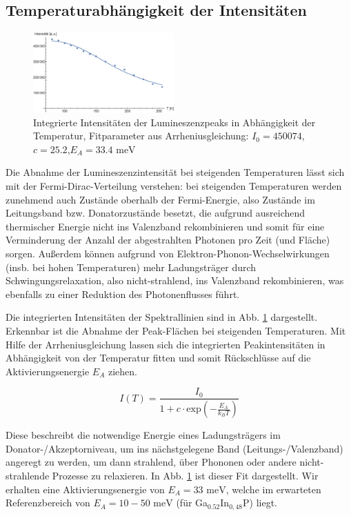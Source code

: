 \documentclass[aps,twocolumn,secnumarabic,nobalancelastpage,amsmath,amssymb,
nofootinbib,superscriptaddress]{revtex4-1}
\begin{document}
\subsection{Temperaturabhängigkeit der Intensitäten}

\begin{figure}[b]
  \centering
  \includegraphics[width=0.48\textwidth]{../Messung/integrintenstempfit.eps}
  \caption{\label{fig:intInt}Integrierte Intensitäten der Lumineszenzpeaks in Abhängigkeit
  der Temperatur,
  Fitparameter aus Arrheniusgleichung: $I_0=450074$,$c=25.2$,$E_A=33.4\text{ meV}$}
\end{figure}

\noindent Die Abnahme der Lumineszenzintensität bei steigenden Temperaturen lässt sich mit der Fermi-Dirac-Verteilung
verstehen: bei steigenden Temperaturen werden zunehmend auch Zustände oberhalb der Fermi-Energie, also Zustände
im Leitungsband bzw. Donatorzustände besetzt, die aufgrund ausreichend thermischer Energie nicht ins Valenzband
rekombinieren und somit für eine Verminderung der Anzahl der abgestrahlten Photonen pro Zeit (und Fläche) sorgen.
Außerdem können aufgrund von Elektron-Phonon-Wechselwirkungen (insb. bei hohen Temperaturen) mehr Ladungsträger durch
Schwingungsrelaxation, also nicht-strahlend, ins Valenzband rekombinieren, was ebenfalls zu einer Reduktion des
Photonenflusses führt.

Die integrierten Intensitäten der Spektrallinien sind in Abb. \ref{fig:intInt} dargestellt. Erkennbar ist
die Abnahme der Peak-Flächen bei steigenden Temperaturen. Mit Hilfe der Arrheniusgleichung lassen sich die integrierten
Peakintensitäten in Abhängigkeit von der Temperatur fitten und somit Rückschlüsse auf die Aktivierungsenergie $E_A$ ziehen.

  \begin{equation}
    I(T) = \frac{I_0}{1+c\cdot\text{exp}\left( -\frac{E_A}{k_B T} \right)}
  \end{equation}

\noindent Diese beschreibt die notwendige Energie eines Ladungsträgers im Donator-/Akzeptorniveau, um ins nächstgelegene Band
(Leitungs-/Valenzband) angeregt zu werden, um dann strahlend, über Phononen oder andere nicht-strahlende Prozesse zu relaxieren.
In Abb. \ref{fig:intInt} ist dieser Fit dargestellt. Wir erhalten eine Aktivierungsenergie von $E_A=33 \text{ meV}$, welche im erwarteten
Referenzbereich von $E_A=10-50\text{ meV}$ (für Ga$_{0.52}$In$_{0,48}$P) \cite{eact} liegt.
\end{document}
